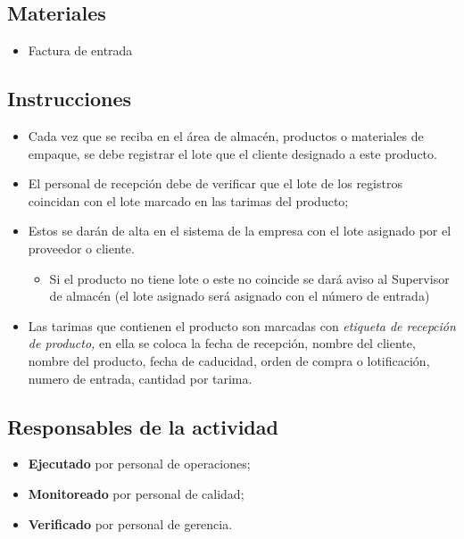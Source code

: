 \subsection{Materiales}

\begin{itemize}
	\item Factura de entrada
\end{itemize}

\subsection{Instrucciones}

\begin{itemize}
	\item Cada vez que se reciba en el área de almacén, productos o materiales de empaque, se debe registrar el lote que el cliente designado a este producto.
	\item El personal de recepción debe de verificar que el lote de los registros coincidan con el lote marcado en las tarimas del producto;
	\item Estos se darán de alta en el sistema de la empresa con el lote asignado por el proveedor o cliente.
	\begin{itemize}
		\item Si el producto no tiene lote o este no coincide se dará aviso al Supervisor de almacén (el lote asignado será asignado con el número de entrada)
	\end{itemize}
	\item Las tarimas que contienen el producto son marcadas con \emph{etiqueta de recepción de producto,} en ella se coloca la fecha de recepción, nombre del cliente, nombre del producto, fecha de caducidad, orden de compra o lotificación, numero de entrada, cantidad por tarima.
\end{itemize}

\subsection{Responsables de la actividad}

\begin{itemize}
	\item \textbf{Ejecutado} por personal de operaciones;
	\item \textbf{Monitoreado} por personal de calidad;
	\item \textbf{Verificado} por personal de gerencia.
\end{itemize}

